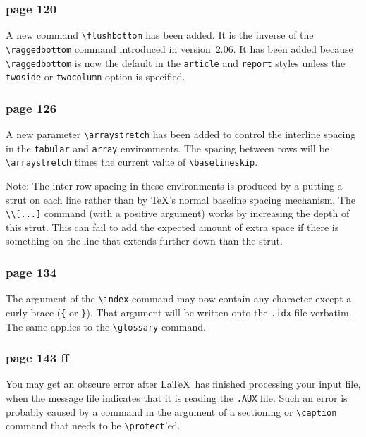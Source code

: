 \subsubsection*{page 120}
A new command \hbox{\verb"\flushbottom"} has been added. It is
the inverse of the\linebreak %
\hbox{\verb"\raggedbottom"} command introduced
in version~2.06.  It has been added because \hbox{\verb"\raggedbottom"}
is now the default in the \hbox{\verb"article"} and \hbox{\verb"report"}
styles unless the \hbox{\verb"twoside"} or \hbox{\verb"twocolumn"}
option is specified.


\subsubsection*{page 126} 
A new parameter \hbox{\verb"\arraystretch"} has been added to control
the interline spacing in the {\tt tabular} and {\tt array}
environments.  The spacing between rows will be \hbox{\verb"\arraystretch"} 
times the current value of \hbox{\verb"\baselineskip"}.

Note: The inter-row spacing in these environments is produced by a
putting a strut on each line rather than by \TeX's normal baseline
spacing mechanism.  The \hbox{\verb"\\[...]"} command (with a positive
argument) works by increasing the depth of this strut.  This can fail
to add the expected amount of extra space if there is something on the
line that extends further down than the strut.


\subsubsection*{page 134}
The argument of the \hbox{\verb"\index"} command may now contain
any character except a curly brace (\hbox{\verb"{"} or \hbox{\verb"}"}).
That argument will be written onto the {\tt .idx} file verbatim.
The same applies to the \hbox{\verb|\glossary|} command.

\subsubsection*{page 143 ff}
You may get an obscure error after \LaTeX\ has finished processing
your input file, when the message file indicates that it is reading
the {\tt .AUX} file.  Such an error is probably caused by a command in
the argument of a sectioning or \hbox{\verb"\caption"} command that
needs to be \hbox{\verb"\protect"}'ed.


